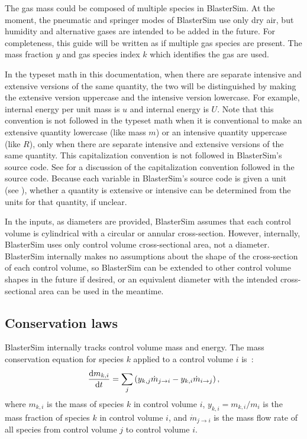 The gas mass could be composed of multiple species in BlasterSim.
At the moment, the pneumatic and springer modes of BlasterSim use only dry air, but humidity and alternative gases are intended to be added in the future.
For completeness, this guide will be written as if multiple gas species are present.
The mass fraction $y$ and gas species index $k$ which identifies the gas are used.

In the typeset math in this documentation, when there are separate intensive and extensive versions of the same quantity, the two will be distinguished by making the extensive version uppercase and the intensive version lowercase.
For example, internal energy per unit mass is $u$ and internal energy is $U$.
Note that this convention is not followed in the typeset math when it is conventional to make an extensive quantity lowercase (like mass $m$) or an intensive quantity uppercase (like $R$), only when there are separate intensive and extensive versions of the same quantity.
This capitalization convention is not followed in BlasterSim's source code.
See  for a discussion of the capitalization convention followed in the source code.
Because each variable in BlasterSim's source code is given a unit (see ), whether a quantity is extensive or intensive can be determined from the units for that quantity, if unclear.

In the inputs, as diameters are provided, BlasterSim assumes that each control volume is cylindrical with a circular or annular cross-section.
However, internally, BlasterSim uses only control volume cross-sectional area, not a diameter.
BlasterSim internally makes no assumptions about the shape of the cross-section of each control volume, so BlasterSim can be extended to other control volume shapes in the future if desired, or an equivalent diameter with the intended cross-sectional area can be used in the meantime.

\subsection{Conservation laws}\label{conservation-laws}

BlasterSim internally tracks control volume mass and energy.
The mass conservation equation for species $k$ applied to a control volume $i$ is~\citep[eq.~4.2, p.~147]{moran_fundamentals_2008}:
\begin{equation}
    \dv{m_{k,i}}{t} = \sum_j \left(y_{k,j} \dot{m}_{j \rightarrow i} - y_{k,i} \dot{m}_{i \rightarrow j}\right),\label{eq:mass conservation}
\end{equation}
where
$m_{k,i}$ is the mass of species $k$ in control volume $i$,
$y_{k,i} = m_{k,i}/m_i$ is the mass fraction of species $k$ in control volume $i$, and
$\dot{m}_{j \rightarrow i}$ is the mass flow rate of all species from control volume $j$ to control volume $i$.

